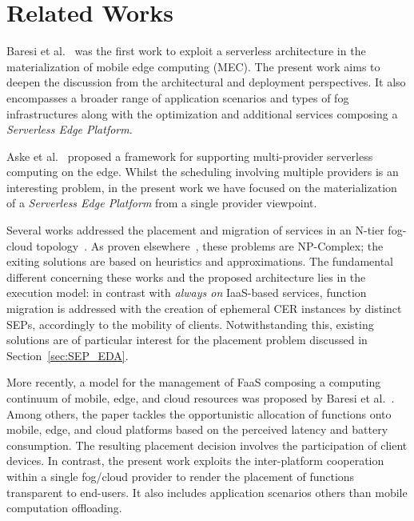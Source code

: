 \section{Related Works}\label{sec:related_works}



Baresi et al.~\cite{GarrigaMendonca2017} was the first work to exploit a serverless architecture in the materialization of mobile edge computing (MEC). The present work aims to  deepen the discussion from the architectural and deployment perspectives. It also encompasses a broader range of application scenarios and types of fog infrastructures along with the optimization and additional services composing a \textit{Serverless Edge Platform}.

Aske et al.~\cite{Aske:2018} proposed a framework for supporting multi-provider serverless computing on the edge. Whilst the scheduling involving multiple 
providers is an interesting problem, in the present work we have focused on the materialization of a \textit{Serverless Edge Platform} from a single provider viewpoint. %

Several works addressed the placement and migration of services in an N-tier fog-cloud topology~\cite{Wang:2015a,Plachy:2016,Machen:2018}. As proven elsewhere~\cite{Tarneberg:2017}, these problems are NP-Complex; the exiting solutions are based on heuristics and approximations.
The fundamental different concerning these works and the proposed architecture lies in the execution model: in contrast with \textit{always on} IaaS-based services, %
function migration is addressed with the creation of ephemeral CER instances by distinct SEPs, accordingly to the mobility of clients. Notwithstanding this, existing solutions are of particular interest for the placement problem discussed in Section~\ref{sec:SEP_EDA}.

More recently, a model for the management of FaaS composing a computing continuum of mobile, edge, and cloud resources was proposed by Baresi et al.~\cite{Baresi:2018}. Among others, the paper tackles the opportunistic allocation of functions onto mobile, edge, and cloud platforms based on the perceived latency and battery consumption. The resulting placement decision involves the participation of client devices. In contrast, the present work exploits the inter-platform cooperation within a single fog/cloud provider to render the placement of functions transparent to end-users. It also includes application scenarios others than mobile computation offloading. 



